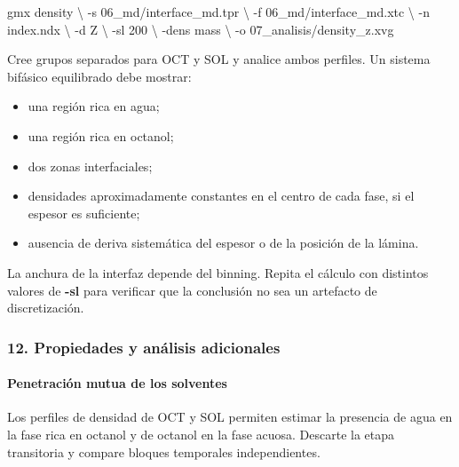 \documentclass[
  spanish,
  11pt,
  a4paper]{article}
\newenvironment{Shaded}{\begin{snugshade}}{\end{snugshade}}
\newcommand{\AttributeTok}[1]{\textcolor[rgb]{0.13,0.29,0.53}{#1}}
\newcommand{\DataTypeTok}[1]{\textcolor[rgb]{0.13,0.29,0.53}{#1}}
\newcommand{\ExtensionTok}[1]{#1}
\newcommand{\NormalTok}[1]{#1}
\providecommand{\tightlist}{%
  \setlength{\itemsep}{0pt}\setlength{\parskip}{0pt}}
\begin{document}
\begin{Shaded}
\begin{Highlighting}[]
\ExtensionTok{gmx}\NormalTok{ density }\DataTypeTok{\textbackslash{}}
    \AttributeTok{{-}s}\NormalTok{ 06\_md/interface\_md.tpr }\DataTypeTok{\textbackslash{}}
    \AttributeTok{{-}f}\NormalTok{ 06\_md/interface\_md.xtc }\DataTypeTok{\textbackslash{}}
    \AttributeTok{{-}n}\NormalTok{ index.ndx }\DataTypeTok{\textbackslash{}}
    \AttributeTok{{-}d}\NormalTok{ Z }\DataTypeTok{\textbackslash{}}
    \AttributeTok{{-}sl}\NormalTok{ 200 }\DataTypeTok{\textbackslash{}}
    \AttributeTok{{-}dens}\NormalTok{ mass }\DataTypeTok{\textbackslash{}}
    \AttributeTok{{-}o}\NormalTok{ 07\_analisis/density\_z.xvg}
\end{Highlighting}
\end{Shaded}

Cree grupos separados para OCT y SOL y analice ambos perfiles. Un
sistema bifásico equilibrado debe mostrar:

\begin{itemize}
\tightlist
\item
  una región rica en agua;
\item
  una región rica en octanol;
\item
  dos zonas interfaciales;
\item
  densidades aproximadamente constantes en el centro de cada fase, si el
  espesor es suficiente;
\item
  ausencia de deriva sistemática del espesor o de la posición de la
  lámina.
\end{itemize}

La anchura de la interfaz depende del binning. Repita el cálculo con
distintos valores de \textbf{-sl} para verificar que la conclusión no
sea un artefacto de discretización.

\subsubsection{12. Propiedades y análisis
adicionales}\label{propiedades-y-anuxe1lisis-adicionales}

\paragraph{Penetración mutua de los
solventes}\label{penetraciuxf3n-mutua-de-los-solventes}

Los perfiles de densidad de OCT y SOL permiten estimar la presencia de
agua en la fase rica en octanol y de octanol en la fase acuosa. Descarte
la etapa transitoria y compare bloques temporales independientes.
\end{document}
